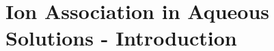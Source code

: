 \mainmatter

\pagestyle{fancy}
\fancyhf{}
\renewcommand{\headrulewidth}{0pt}
\fancyfoot[CE,CO]{\thepage}

\titleformat{\section}[block]{\bfseries\large}{\thesection }{1.5em}{}
\titlespacing*{\chapter}{0pt}{-2.5em}{0pt}
\titlespacing*{\section}{0pt}{0pt}{0pt}

\begingroup
\chapter{Ion Association in Aqueous Solutions - Introduction}
\endgroup

